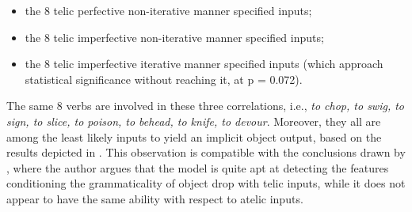 \begin{itemize}
    \item the 8 telic perfective non-iterative manner specified inputs;
    \item the 8 telic imperfective non-iterative manner specified inputs;
    \item the 8 telic imperfective iterative manner specified inputs (which approach statistical significance without reaching it, at p = 0.072).
\end{itemize}

The same 8 verbs are involved in these three correlations, i.e., \textit{to chop, to swig, to sign, to slice, to poison, to behead, to knife, to devour}. Moreover, they all are among the least likely inputs to yield an implicit object output, based on the results depicted in . This observation is compatible with the conclusions drawn by \textcite[150-152]{Medina2007}, where the author argues that the model is quite apt at detecting the features conditioning the grammaticality of object drop with telic inputs, while it does not appear to have the same ability with respect to atelic inputs.


